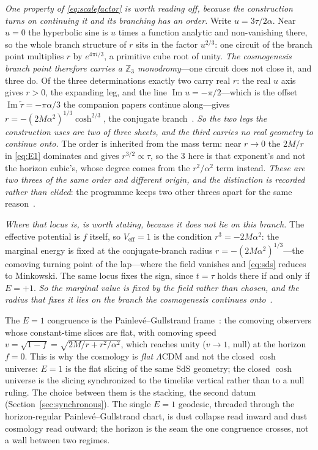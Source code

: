 \documentclass[11pt,a4paper]{article}
\theoremstyle{definition}
\begin{document}
\emph{One property of \eqref{eq:scalefactor} is worth reading off, because the construction turns on continuing it and its branching has an order.} Write $u=3\tau/2\alpha$. Near $u=0$ the hyperbolic sine is $u$ times a function analytic and non-vanishing there, so the whole branch structure of $r$ sits in the factor $u^{2/3}$: one circuit of the branch point multiplies $r$ by $e^{4\pi i/3}$, a primitive cube root of unity. \emph{The cosmogenesis branch point therefore carries a $\mathbb{Z}_3$ monodromy}---one circuit does not close it, and three do. Of the three determinations exactly two carry real $r$: the real $u$ axis gives $r>0$, the expanding leg, and the line $\operatorname{Im}u=-\pi/2$---which is the offset $\operatorname{Im}\tilde\tau=-\pi\alpha/3$ the companion papers continue along---gives $r=-(2M\alpha^{2})^{1/3}\cosh^{2/3}$, the conjugate branch~\cite{JanzenCircle,JanzenSlicing}. \emph{So the two legs the construction uses are two of three sheets, and the third carries no real geometry to continue onto.} The order is inherited from the mass term: near $r\to0$ the $2M/r$ in \eqref{eq:E1} dominates and gives $r^{3/2}\propto\tau$, so the $3$ here is that exponent's and not the horizon cubic's, whose degree comes from the $r^{2}/\alpha^{2}$ term instead. \emph{These are two threes of the same order and different origin, and the distinction is recorded rather than elided}: the programme keeps two other threes apart for the same reason~\cite{JanzenMatter}.

\emph{Where that locus is, is worth stating, because it does not lie on this branch.} The effective potential is $f$ itself, so $V_{\mathrm{eff}}=1$ is the condition $r^{3}=-2M\alpha^{2}$: the marginal energy is fixed at the conjugate-branch radius $r=-(2M\alpha^{2})^{1/3}$---the comoving turning point of the lap---where the field vanishes and \eqref{eq:sds} reduces to Minkowski. The same locus fixes the sign, since $t=\tau$ holds there if and only if $E=+1$. \emph{So the marginal value is fixed by the field rather than chosen, and the radius that fixes it lies on the branch the cosmogenesis continues onto}~\cite{JanzenCircle,JanzenCRframework}.

The $E=1$ congruence is the Painlev\'e--Gullstrand frame~\cite{Painleve1921,Gullstrand1922}: the comoving observers whose constant-time slices are flat, with comoving speed $v=\sqrt{1-f}=\sqrt{2M/r+r^{2}/\alpha^{2}}$, which reaches unity ($v\to1$, null) at the horizon $f=0$. This is why the cosmology is \emph{flat} $\Lambda$CDM and not the closed $\cosh$ universe: $E=1$ is the flat slicing of the same SdS geometry; the closed $\cosh$ universe is the slicing synchronized to the timelike vertical rather than to a null ruling. The choice between them is the stacking, the second datum (Section~\ref{sec:synchronous}). The single $E=1$ geodesic, threaded through the horizon-regular Painlev\'e--Gullstrand chart, is dust collapse read inward and dust cosmology read outward; the horizon is the seam the one congruence crosses, not a wall between two regimes.
\end{document}
